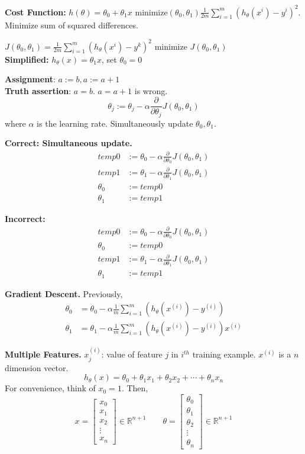 \documentclass[a4 paper, 11 pt]{article}
\begin{document}
\textbf{Cost Function:} $h(\theta) = \theta_0 + \theta_1 x$
minimize$(\theta_0, \theta_1) \frac{1}{2m} \sum_{i=1}^m (h_\theta(x^i) - y^i)^2$. Minimize sum of squared differences.

$J(\theta_0, \theta_1) = \frac{1}{2m}\sum_{i=1}^m (h_\theta(x^i) - y^k)^2$
minimize $J(\theta_0, \theta_1)$ \\

\textbf{Simplified:} $h_\theta(x) = \theta_1 x$, set $\theta_0 = 0$

\textbf{Assignment}: $a := b, a:= a + 1$ \\
\textbf{Truth assertion}: $a = b$. $a = a + 1$ is wrong. \\

\[
\theta_j := \theta_j - \alpha \frac{\partial}{\partial\theta_j}J(\theta_0, \theta_1)
\]
where $\alpha$ is the learning rate. Simultaneously update $\theta_0, \theta_1$.

\textbf{Correct: Simultaneous update.}
\begin{align*}
temp0 &:= \theta_0 - \alpha \frac{\partial}{\partial\theta_0}J(\theta_0, \theta_1) \\
temp1 &:= \theta_1 - \alpha \frac{\partial}{\partial\theta_1}J(\theta_0, \theta_1) \\
\theta_0 & := temp0 \\
\theta_1 & := temp1
\end{align*}

\textbf{Incorrect:}
\begin{align*}
temp0 &:= \theta_0 - \alpha \frac{\partial}{\partial\theta_0}J(\theta_0, \theta_1) \\
\theta_0 & := temp0 \\
temp1 &:= \theta_1 - \alpha \frac{\partial}{\partial\theta_1}J(\theta_0, \theta_1) \\
\theta_1 & := temp1
\end{align*}

\textbf{Gradient Descent.}
Previously,
\begin{align*}
\theta_0 &= \theta_0 - \alpha \frac{1}{m}\sum_{i=1}^m (h_\theta(x^{(i)}) - y^{(i)}) \\
\theta_1 &= \theta_1 - \alpha \frac{1}{m} \sum_{i=1}^m (h_\theta(x^{(i)}) - y^{(i)})x^{(i)}
\end{align*}

\newpage
\textbf{Multiple Features.}
$x^{(i)}_j$: value of feature $j$ in $i^{th}$ training example. $x^{(i)}$ is a $n$ dimension vector. 
\[
h_\theta (x) = \theta_0 + \theta_1 x_1 + \theta_2 x_2 + \cdots + \theta_n x_n
\]
For convenience, think of $x_0 = 1$. Then,
\[
x = \begin{bmatrix} x_0 \\ x_1 \\ x_2 \\ \vdots \\ x_n \end{bmatrix} \in \mathbb{R}^{n+1} \qquad
\theta = \begin{bmatrix} \theta_0 \\ \theta_1 \\ \theta_2 \\ \vdots \\ \theta_n \end{bmatrix} \in \mathbb{R}^{n+1}
\]
\end{document}

